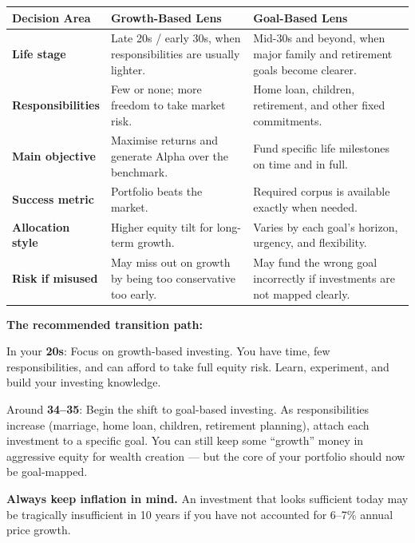 \documentclass[12pt,a4paper]{article}
\begin{document}
\begin{center}
\begingroup
\renewcommand{\arraystretch}{1.5}
\setlength{\tabcolsep}{5pt}
\begin{tabularx}{\linewidth}{@{}B{3.4cm} >{\raggedright\arraybackslash}X >{\raggedright\arraybackslash}X@{}}
\color{white}\textbf{Decision Area}
& \color{white}\textbf{Growth-Based Lens}
& \color{white}\textbf{Goal-Based Lens}\\
\midrule
{}\textbf{Life stage}
& Late 20s / early 30s, when responsibilities are usually lighter.
& Mid-30s and beyond, when major family and retirement goals become clearer.\\[5pt]
\textbf{Responsibilities}
& Few or none; more freedom to take market risk.
& Home loan, children, retirement, and other fixed commitments.\\[5pt]
\textbf{Main objective}
& Maximise returns and generate Alpha over the benchmark.
& Fund specific life milestones on time and in full.\\[5pt]
\textbf{Success metric}
& Portfolio beats the market.
& Required corpus is available exactly when needed.\\[5pt]
\textbf{Allocation style}
& Higher equity tilt for long-term growth.
& Varies by each goal's horizon, urgency, and flexibility.\\[5pt]
\textbf{Risk if misused}
& May miss out on growth by being too conservative too early.
& May fund the wrong goal incorrectly if investments are not mapped clearly.\\
\bottomrule
\end{tabularx}
\endgroup
\end{center}

\vspace{3mm}

\begin{keybox}
\textbf{The recommended transition path:}

In your \textbf{20s}: Focus on growth-based investing. You have time, few responsibilities, and can afford to take full equity risk. Learn, experiment, and build your investing knowledge.

Around \textbf{34--35}: Begin the shift to goal-based investing. As responsibilities increase (marriage, home loan, children, retirement planning), attach each investment to a specific goal. You can still keep some ``growth'' money in aggressive equity for wealth creation --- but the core of your portfolio should now be goal-mapped.

\textbf{Always keep inflation in mind.} An investment that looks sufficient today may be tragically insufficient in 10 years if you have not accounted for 6--7\% annual price growth.
\end{keybox}
\end{document}

